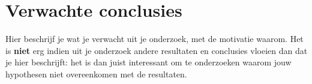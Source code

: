 \section{Verwachte conclusies}
\label{sec:verwachte_conclusies}

Hier beschrijf je wat je verwacht uit je onderzoek, met de motivatie waarom. Het is \textbf{niet} erg indien uit je onderzoek andere resultaten en conclusies vloeien dan dat je hier beschrijft: het is dan juist interessant om te onderzoeken waarom jouw hypothesen niet overeenkomen met de resultaten.


